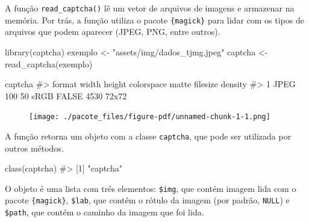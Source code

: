 \documentclass[12pt,twoside,brazilian]{book}
\newenvironment{Shaded}{\begin{snugshade}}{\end{snugshade}}
\newcommand{\CommentTok}[1]{\textcolor[rgb]{0.37,0.37,0.37}{#1}}
\newcommand{\FunctionTok}[1]{\textcolor[rgb]{0.28,0.35,0.67}{#1}}
\newcommand{\NormalTok}[1]{\textcolor[rgb]{0.00,0.23,0.31}{#1}}
\newcommand{\OtherTok}[1]{\textcolor[rgb]{0.00,0.23,0.31}{#1}}
\newcommand{\StringTok}[1]{\textcolor[rgb]{0.13,0.47,0.30}{#1}}
\begin{document}
A função \texttt{read\_captcha()} lê um vetor de arquivos de imagens e
armazenar na memória. Por trás, a função utiliza o pacote
\texttt{\{magick\}} para lidar com os tipos de arquivos que podem
aparecer (JPEG, PNG, entre outros).

\begin{Shaded}
\begin{Highlighting}[]
\FunctionTok{library}\NormalTok{(captcha)}
\NormalTok{exemplo }\OtherTok{\textless{}{-}} \StringTok{"assets/img/dados\_tjmg.jpeg"}
\NormalTok{captcha }\OtherTok{\textless{}{-}} \FunctionTok{read\_captcha}\NormalTok{(exemplo)}

\NormalTok{captcha}
\CommentTok{\#\textgreater{}   format width height colorspace matte filesize density}
\CommentTok{\#\textgreater{} 1   JPEG   100     50       sRGB FALSE     4530   72x72}
\end{Highlighting}
\end{Shaded}

\begin{figure}[H]

{\centering \texttt{[image: ./pacote\_files/figure-pdf/unnamed-chunk-1-1.png]}

}

\end{figure}

A função retorna um objeto com a classe \texttt{captcha}, que pode ser
utilizada por outros métodos.

\begin{Shaded}
\begin{Highlighting}[]
\FunctionTok{class}\NormalTok{(captcha)}
\CommentTok{\#\textgreater{} [1] "captcha"}
\end{Highlighting}
\end{Shaded}

O objeto é uma lista com três elementos: \texttt{\$img}, que contém
imagem lida com o pacote \texttt{\{magick\}}, \texttt{\$lab}, que contém
o rótulo da imagem (por padrão, \texttt{NULL}) e \texttt{\$path}, que
contém o caminho da imagem que foi lida.

\begin{Shaded}
\end{Shaded}
\end{document}
